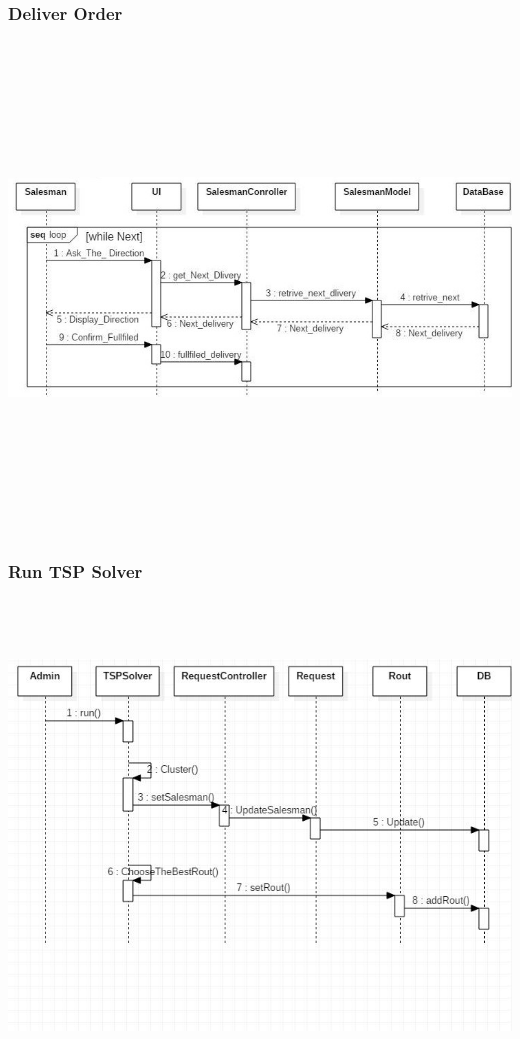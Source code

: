 \documentclass[12pt]{article}
\begin{document}
\subsubsection{ Deliver Order }
\begin{center}
	\includegraphics[width=17cm,height=13cm]{./assets/sequencediagram/deliverorder.png}\\
\end{center}

\subsubsection{ Run TSP Solver }
\begin{center}
	\includegraphics[width=17cm,height=13cm]{./assets/sequencediagram/runtspsolver.png}\\
\end{center}
\end{document}
